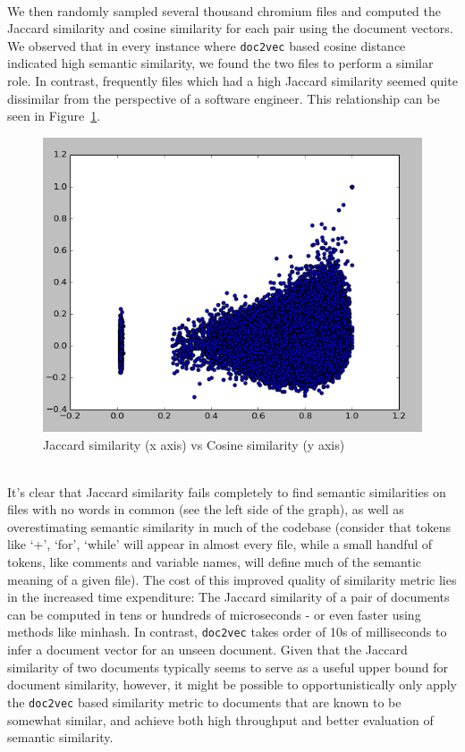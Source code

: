 \documentclass[11pt]{article}
\begin{document}
\\We then randomly sampled several thousand chromium files and computed the
Jaccard similarity and cosine similarity for each pair using the document vectors.
We observed that in every instance where \texttt{doc2vec} based cosine distance
indicated high semantic similarity, we found the two files to perform a similar
role. In contrast, frequently files which had a high Jaccard similarity seemed
quite dissimilar from the perspective of a software engineer. This relationship
can be seen in Figure~\ref{fig:graph}.
\begin{figure}
  \centering
    \includegraphics[width=0.5\linewidth]{js-vs-cosine.png}
  \caption{Jaccard similarity (x axis) vs Cosine similarity (y axis)}
  \label{fig:graph}
\end{figure}
\\It's clear that Jaccard similarity fails completely to find semantic
similarities on files with no words in common (see the left side of the graph),
as well as overestimating semantic similarity in much of the codebase (consider that
tokens like `+', `for', `while' will appear in almost every file, while a small
handful of tokens, like comments and variable names, will define much of the
semantic meaning of a given file).
The cost of this improved quality of similarity metric lies in the increased
time expenditure: The Jaccard similarity of a pair of documents can be computed
in tens or hundreds of microseconds - or even faster using methods like minhash.
In contrast, \texttt{doc2vec} takes order of 10s of milliseconds to infer a document
vector for an unseen document. Given that the Jaccard similarity of two documents
typically seems to serve as a useful upper bound for document similarity, however,
it might be possible to opportunistically only apply the \texttt{doc2vec} based
similarity metric to documents that are known to be somewhat similar, and achieve
both high throughput and better evaluation of semantic similarity.
\end{document}
